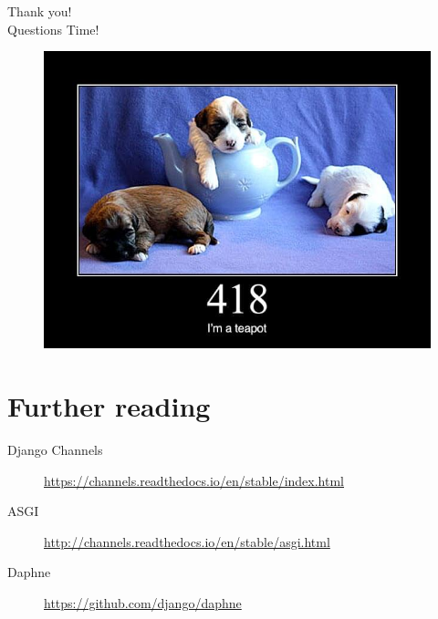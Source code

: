 \documentclass{beamer}
\begin{document}
\begin{frame}
\begin{center}
	{\fontsize{30pt}{10.2}\selectfont Thank you!}\\
	\vspace{1em}
	Questions Time!
\end{center}
\end{frame}

\begin{frame}
\begin{center}
	\begin{figure}
	\includegraphics[scale=0.43]{teapot.jpg}
	\end{figure}
\end{center}
\end{frame}

\section{Further reading}

\begin{frame}
	\begin{description}
		\item[Django Channels] \url{https://channels.readthedocs.io/en/stable/index.html}
		\item[ASGI] \url{http://channels.readthedocs.io/en/stable/asgi.html}
		\item[Daphne] \url{https://github.com/django/daphne}
	\end{description}
\end{frame}
\end{document}
